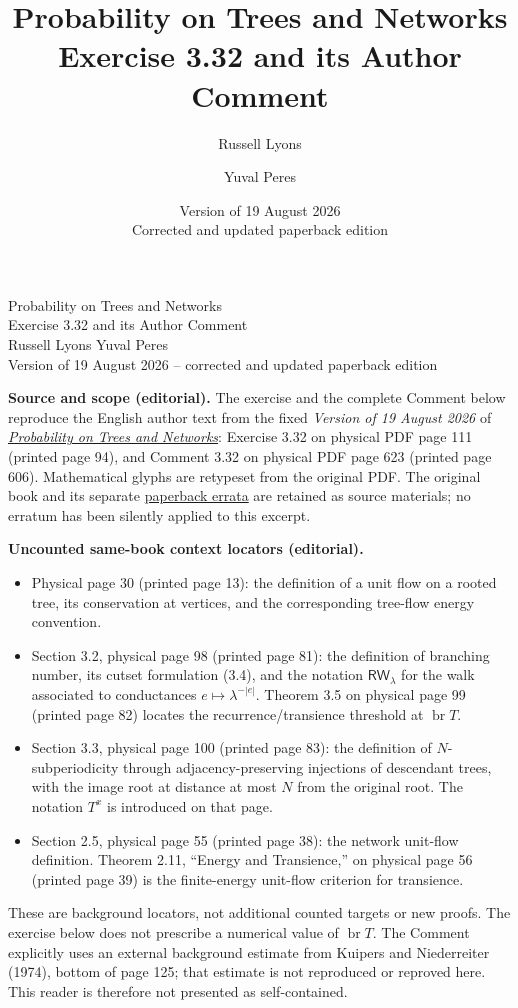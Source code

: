 \documentclass[11pt]{article}
\title{Probability on Trees and Networks\\Exercise 3.32 and its Author Comment}
\author{Russell Lyons \and Yuval Peres}
\date{Version of 19 August 2026\\Corrected and updated paperback edition}
\newcommand{\RW}{\mathsf{RW}}
\begin{document}
\begin{center}
{\large Probability on Trees and Networks\\[2pt]
Exercise 3.32 and its Author Comment}\\[4pt]
Russell Lyons \quad Yuval Peres\\[2pt]
Version of 19 August 2026 -- corrected and updated paperback edition
\end{center}
\small

\noindent\textbf{Source and scope (editorial).}
The exercise and the complete Comment below reproduce the English author
text from the fixed \emph{Version of 19 August 2026} of
\href{https://rdlyons.pages.iu.edu/prbtree/book_pb.pdf}{\emph{Probability on Trees and Networks}}:
Exercise 3.32 on physical PDF page 111 (printed page 94), and Comment 3.32
on physical PDF page 623 (printed page 606). Mathematical glyphs are
retypeset from the original PDF. The original book and its separate
\href{https://rdlyons.pages.iu.edu/prbtree/errata2.pdf}{paperback errata}
are retained as source materials; no erratum has been silently applied
to this excerpt.

\medskip
\noindent\textbf{Uncounted same-book context locators (editorial).}
\begin{itemize}
\item Physical page 30 (printed page 13): the definition of a unit flow
on a rooted tree, its conservation at vertices, and the corresponding
tree-flow energy convention.
\item Section 3.2, physical page 98 (printed page 81): the definition of
branching number, its cutset formulation (3.4), and the notation
$\RW_\lambda$ for the walk associated to conductances
$e\mapsto\lambda^{-|e|}$. Theorem 3.5 on physical page 99 (printed
page 82) locates the recurrence/transience threshold at $\operatorname{br}T$.
\item Section 3.3, physical page 100 (printed page 83): the definition of
$N$-subperiodicity through adjacency-preserving injections of descendant
trees, with the image root at distance at most $N$ from the original
root. The notation $T^x$ is introduced on that page.
\item Section 2.5, physical page 55 (printed page 38): the network unit-flow
definition. Theorem 2.11, ``Energy and Transience,'' on physical page 56
(printed page 39) is the finite-energy unit-flow criterion for transience.
\end{itemize}
These are background locators, not additional counted targets or new
proofs. The exercise below does not prescribe a numerical value of
$\operatorname{br}T$. The Comment explicitly uses an external background
estimate from Kuipers and Niederreiter (1974), bottom of page 125; that
estimate is not reproduced or reproved here. This reader is therefore
not presented as self-contained.
\normalsize
\end{document}
